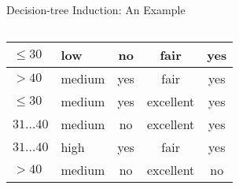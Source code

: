 \begin{frame}{Decision-tree Induction: An Example}
\begin{columns}
\begin{column}{0.6\textwidth}
\begin{tabular}{|l|l|c|c|c|}
				\cellcolor{yellow!20}$\leq 30$    & \cellcolor{yellow!20}low    & \cellcolor{yellow!20}no    & \cellcolor{yellow!20}fair         & \cellcolor{green!20}yes \\\hline
				\cellcolor{yellow!20}$>40$        & \cellcolor{yellow!20}medium & \cellcolor{yellow!20}yes   & \cellcolor{yellow!20}fair         & \cellcolor{green!20}yes \\\hline
				\cellcolor{yellow!20}$\leq 30$    & \cellcolor{yellow!20}medium & \cellcolor{yellow!20}yes   & \cellcolor{yellow!20}excellent    & \cellcolor{green!20}yes \\\hline
				\cellcolor{yellow!20}$31\ldots40$ & \cellcolor{yellow!20}medium & \cellcolor{yellow!20}no    & \cellcolor{yellow!20}excellent    & \cellcolor{green!20}yes \\\hline
				\cellcolor{yellow!20}$31\ldots40$ & \cellcolor{yellow!20}high   & \cellcolor{yellow!20}yes   & \cellcolor{yellow!20}fair         & \cellcolor{green!20}yes \\\hline
				\cellcolor{yellow!20}$>40$        & \cellcolor{yellow!20}medium & \cellcolor{yellow!20}no    & \cellcolor{yellow!20}excellent    & \cellcolor{red!20}no    \\\hline
			\end{tabular}
		\end{column}
	\end{columns}
\end{frame}

